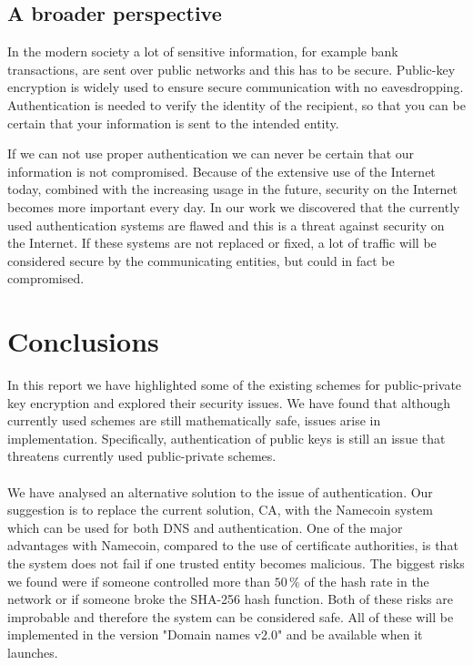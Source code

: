 \documentclass[frame, english]{idamasterthesis}
\begin{document}
\subsection{A broader perspective}
In the modern society a lot of sensitive information, for example bank transactions, are sent over public networks and this has to be secure. Public-key encryption is widely used to ensure secure communication with no eavesdropping. Authentication is needed to verify the identity of the recipient, so that you can be certain that your information is sent to the intended entity.

\pagebreak

\noindent
If we can not use proper authentication we can never be certain that our information is not compromised. Because of the extensive use of the Internet today, combined with the increasing usage in the future, security on the Internet becomes more important every day. In our work we discovered that the currently used authentication systems are flawed and this is a threat against security on the Internet. If these systems are not replaced or fixed, a lot of traffic will be considered secure by the communicating entities, but could in fact be compromised.  

\section{Conclusions}
In this report we have highlighted some of the existing schemes for public-private key encryption and explored their security issues. We have found that although currently used schemes are still mathematically safe, issues arise in implementation. Specifically, authentication of public keys is still an issue that threatens currently used public-private schemes.\\\\
We have analysed an alternative solution to the issue of authentication. Our suggestion is to replace the current solution, CA, with the Namecoin system which can be used for both DNS and authentication. One of the major advantages with Namecoin, compared to the use of certificate authorities, is that the system does not fail if one trusted entity becomes malicious. The biggest risks we found were if someone controlled more than $50 \, \%$ of the hash rate in the network or if someone broke the SHA-256 hash function. Both of these risks are improbable and therefore the system can be considered safe. All of these will be implemented in the version "Domain names v2.0" and be available when it launches. 
\end{document}
